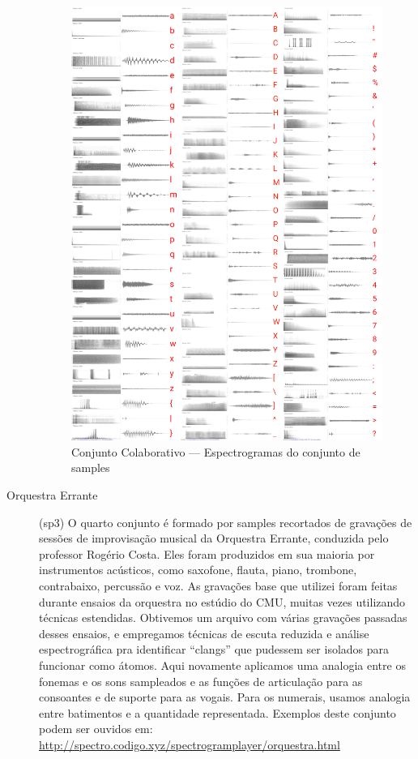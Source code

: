 \begin{description}
\begin{figure}
    \caption{\label{samplescolab}Conjunto Colaborativo --- Espectrogramas do conjunto de samples}
    \begin{center}
        \includegraphics[width=1\linewidth]{pictures/cap3/bandaabertacolab.jpg}
    \end{center}
\end{figure}

\item[Orquestra Errante] (sp3) O quarto conjunto é formado por samples recortados de gravações de sessões de improvisação musical da Orquestra Errante, conduzida pelo professor Rogério Costa. Eles foram produzidos em sua maioria por instrumentos acústicos, como saxofone, flauta, piano, trombone, contrabaixo, percussão e voz. As gravações base que utilizei foram feitas durante ensaios da orquestra no estúdio do CMU, muitas vezes utilizando técnicas estendidas. Obtivemos um arquivo com várias gravações passadas desses ensaios, e empregamos técnicas de escuta reduzida e análise espectrográfica pra identificar ``clangs'' que pudessem ser isolados para funcionar como átomos. Aqui novamente aplicamos uma analogia entre os fonemas e os sons sampleados e as funções de articulação para as consoantes e de suporte para as vogais. Para os numerais, usamos analogia entre batimentos e a quantidade representada. Exemplos deste conjunto podem ser ouvidos em: \url{http://spectro.codigo.xyz/spectrogramplayer/orquestra.html}
\end{description}

